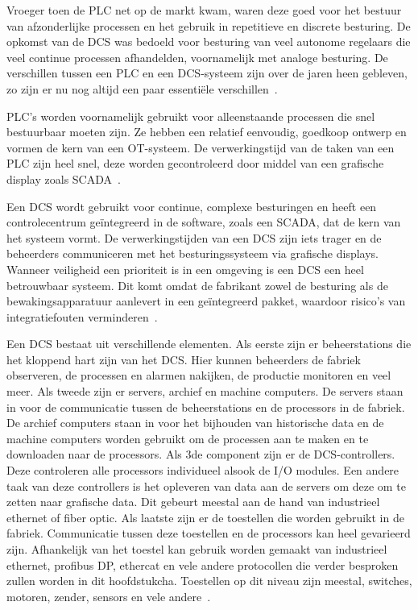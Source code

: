 Vroeger toen de PLC net op de markt kwam, waren deze goed voor het bestuur van afzonderlijke processen en het gebruik in repetitieve en discrete besturing. De opkomst van de DCS was bedoeld voor besturing van veel autonome regelaars die veel continue processen afhandelden, voornamelijk met analoge besturing. De verschillen tussen een PLC en een DCS-systeem zijn over de jaren heen gebleven, zo zijn er nu nog altijd een paar essentiële verschillen~\autocite{Realpars2019}. 

PLC's worden voornamelijk gebruikt voor alleenstaande processen die snel bestuurbaar moeten zijn. Ze hebben een relatief eenvoudig, goedkoop ontwerp en vormen de kern van een OT-systeem. De verwerkingstijd van de taken van een PLC zijn heel snel, deze worden gecontroleerd door middel van een grafische display zoals SCADA~\autocite{Realpars2019}.

Een DCS wordt gebruikt voor continue, complexe besturingen en heeft een controlecentrum geïntegreerd in de software, zoals een SCADA, dat de kern van het systeem vormt. De verwerkingstijden van een DCS zijn iets trager en de beheerders communiceren met het besturingssysteem via grafische displays. Wanneer veiligheid een prioriteit is in een omgeving is een DCS een heel betrouwbaar systeem. Dit komt omdat de fabrikant zowel de besturing als de bewakingsapparatuur aanlevert in een geïntegreerd pakket, waardoor risico's van integratiefouten verminderen~\autocite{Realpars2019}.

Een DCS bestaat uit verschillende elementen. Als eerste zijn er beheerstations die het kloppend hart zijn van het DCS. Hier kunnen beheerders de fabriek observeren, de processen en alarmen nakijken, de productie monitoren en veel meer. Als tweede zijn er servers, archief en machine computers. De servers staan in voor de communicatie tussen de beheerstations en de processors in de fabriek. De archief computers staan in voor het bijhouden van historische data en de machine computers worden gebruikt om de processen aan te maken en te downloaden naar de processors. Als 3de component zijn er de DCS-controllers. Deze controleren alle processors individueel alsook de I/O modules. Een andere taak van deze controllers is het opleveren van data aan de servers om deze om te zetten naar grafische data. Dit gebeurt meestal aan de hand van industrieel ethernet of fiber optic. Als laatste zijn er de toestellen die worden gebruikt in de fabriek. Communicatie tussen deze toestellen en de processors kan heel gevarieerd zijn. Afhankelijk van het toestel kan gebruik worden gemaakt van industrieel ethernet, profibus DP, ethercat en vele andere protocollen die verder besproken zullen worden in dit hoofdstukcha. Toestellen op dit niveau zijn meestal, switches, motoren, zender, sensors en vele andere~\autocite{Realpars2019}.

